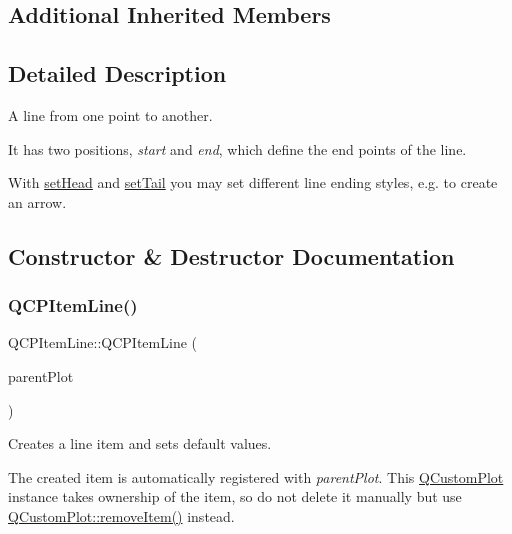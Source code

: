 \subsection*{Additional Inherited Members}


\subsection{Detailed Description}
A line from one point to another. 

 It has two positions, {\itshape start} and {\itshape end}, which define the end points of the line.

With \mbox{\hyperlink{class_q_c_p_item_line_aebf3d687114d584e0459db6759e2c3c3}{set\+Head}} and \mbox{\hyperlink{class_q_c_p_item_line_ac264222c3297a7efe33df9345c811a5f}{set\+Tail}} you may set different line ending styles, e.\+g. to create an arrow. 

\subsection{Constructor \& Destructor Documentation}
\mbox{\label{class_q_c_p_item_line_a17804b7f64961c6accf25b61e85142e3}} 
\subsubsection{\texorpdfstring{QCPItemLine()}{QCPItemLine()}}
{\footnotesize\ttfamily Q\+C\+P\+Item\+Line\+::\+Q\+C\+P\+Item\+Line (\begin{DoxyParamCaption}\item[{\mbox{\hyperlink{class_q_custom_plot}{Q\+Custom\+Plot}} $\ast$}]{parent\+Plot }\end{DoxyParamCaption})\hspace{0.3cm}{\ttfamily [explicit]}}

Creates a line item and sets default values.

The created item is automatically registered with {\itshape parent\+Plot}. This \mbox{\hyperlink{class_q_custom_plot}{Q\+Custom\+Plot}} instance takes ownership of the item, so do not delete it manually but use \mbox{\hyperlink{class_q_custom_plot_ae04446557292551e8fb6e2c106e1848d}{Q\+Custom\+Plot\+::remove\+Item()}} instead. \mbox{\label{class_q_c_p_item_line_a94b5aaae048171e5306dc4695b991283}} 
